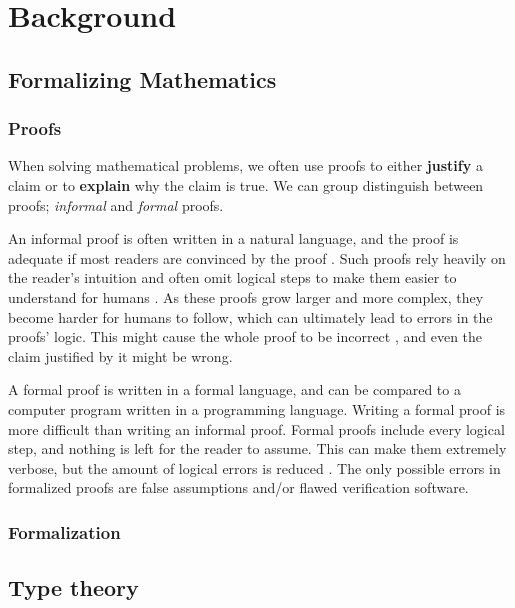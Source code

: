 \chapter{Background}

\section{Formalizing Mathematics}

\subsection{Proofs}

When solving mathematical problems, we often use proofs
to either \textbf{justify} a claim or to \textbf{explain} why the claim is true.
We can group distinguish between proofs; \textit{informal} and \textit{formal} proofs.


An informal proof is often written in a natural language, and the proof is adequate if most
readers are convinced by the proof \cite{bpierce}. Such proofs rely heavily on the reader's intuition
and often omit logical steps to make them easier to understand for humans \cite{ams:formal-proof}.
As these proofs grow larger and more complex, they become harder for humans to follow,
which can ultimately lead to errors in the proofs' logic. This might cause the whole proof
to be incorrect \cite{rkhamsi}, and even the claim justified by it might be wrong.

A formal proof is written in a formal language, and can be compared to a computer program
written in a programming language. Writing a formal proof is more difficult than writing an informal proof.
Formal proofs include every logical step, and nothing is left for the reader to assume.
This can make them extremely verbose, but the amount of logical errors is reduced \cite{ams:formal-proof}.
The only possible errors in formalized proofs are false assumptions and/or flawed verification software.

\subsection{Formalization}

\section{Type theory}

